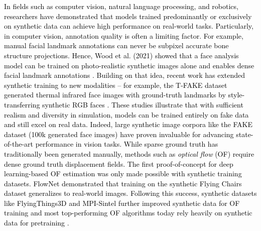\documentclass{article}
\newcommand{\phflo}[1]{\textcolor{black}{#1}}
\begin{document}
\phflo{In fields such as computer vision, natural language processing, and robotics, researchers have demonstrated that models trained predominantly or exclusively on synthetic data can achieve high performance on real-world tasks. Particularly, in computer vision, annotation quality is often a limiting factor. For example, manual facial landmark annotations can never be subpixel accurate bone structure projections. Hence, Wood et al. (2021) showed that a face analysis model can be trained on photo-realistic synthetic images alone and enables dense facial landmark annotations \cite{wood2021fake}. Building on that idea, recent work has extended synthetic training to new modalities – for example, the T-FAKE dataset generated thermal infrared face images with ground-truth landmarks by style-transferring synthetic RGB faces \cite{flotho2024t}. These studies illustrate that with sufficient realism and diversity in simulation, models can be trained entirely on fake data and still excel on real data. Indeed, large synthetic image corpora like the FAKE dataset (100k generated face images) have proven invaluable for advancing state-of-the-art performance in vision tasks. 
While sparse ground truth has traditionally been generated manually, methods such as \textit{optical flow} (OF) require dense ground truth displacement fields. The first proof-of-concept for deep learning-based OF estimation was only made possible with synthetic training datasets. FlowNet demonstrated that training on the synthetic Flying Chairs dataset generalizes to real-world images.
Following this success, synthetic datasets like FlyingThings3D \cite{Mayer_2016_CVPR} and MPI-Sintel \cite{ButlerWSB12} further improved synthetic data for OF training and most top-performing OF algorithms today rely heavily on synthetic data for pretraining \cite{teed2020raft}.}
	
\end{document}
